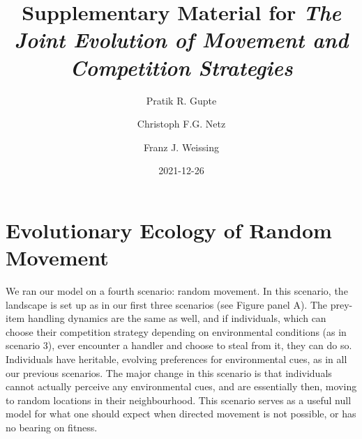 \documentclass[]{scrartcl}
\title{Supplementary Material for \emph{The Joint Evolution of Movement and Competition Strategies}}
\author{Pratik R. Gupte \and Christoph F.G. Netz \and Franz J. Weissing}
\date{2021-12-26}
\begin{document}
\maketitle

{
\setcounter{tocdepth}{2}
\tableofcontents
}
\newpage

\hypertarget{evolutionary-ecology-of-random-movement}{%
\section{Evolutionary Ecology of Random Movement}\label{evolutionary-ecology-of-random-movement}}

We ran our model on a fourth scenario: random movement.
In this scenario, the landscape is set up as in our first three scenarios (see Figure panel A).
The prey-item handling dynamics are the same as well, and if individuals, which can choose their competition strategy depending on environmental conditions (as in scenario 3), ever encounter a handler and choose to steal from it, they can do so.
Individuals have heritable, evolving preferences for environmental cues, as in all our previous scenarios.
The major change in this scenario is that individuals cannot actually perceive any environmental cues, and are essentially then, moving to random locations in their neighbourhood.
This scenario serves as a useful null model for what one should expect when directed movement is not possible, or has no bearing on fitness.
\end{document}
